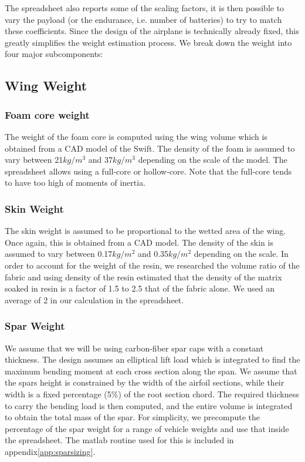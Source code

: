 \documentclass[titlepage,10pt]{article}
\begin{document}
The spreadsheet also reports some of the scaling factors, it is then possible to vary the payload (or the endurance, i.e. number of batteries) to try to match these coefficients. Since the design of the airplane is technically already fixed, this greatly simplifies the weight estimation process. We break down the weight into four major subcomponents:

\subsection{Wing Weight}
\subsubsection{Foam core weight}
The weight of the foam core is computed using the wing volume which is obtained from a CAD model of the Swift. The density of the foam is assumed to vary between 21$kg/m^3$ and 37$kg/m^3$ depending on the scale of the model. The spreadsheet allows using a full-core or hollow-core. Note that the full-core tends to have too high of moments of inertia.

\subsubsection{Skin Weight}
The skin weight is assumed to be proportional to the wetted area of the wing. Once again, this is obtained from a CAD model. The density of the skin is assumed to vary between 0.17$kg/m^2$ and 0.35$kg/m^2$ depending on the scale. In order to account for the weight of the resin, we researched the volume ratio of the fabric and using density of the resin estimated that the density of the matrix soaked in resin is a factor of 1.5 to 2.5 that of the fabric alone. We used an average of 2 in our calculation in the spreadsheet.

\subsubsection{Spar Weight}
We assume that we will be using carbon-fiber spar caps with a constant thickness. The design assumes an elliptical lift load which is integrated to find the maximum bending moment at each cross section along the span. We assume that the spars height is constrained by the width of the airfoil sections, while their width is a fixed percentage (5\%) of the root section chord. The required thickness to carry the bending load is then computed, and the entire volume is integrated to obtain the total mass of the spar. For simplicity, we precompute the percentage of the spar weight for a range of vehicle weights and use that inside the spreadsheet. The matlab routine used for this is included in appendix\ref{app:sparsizing}. 
\end{document}
